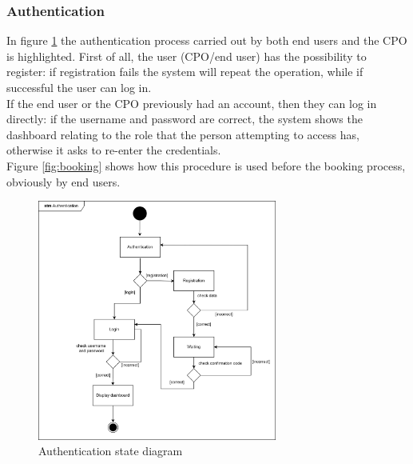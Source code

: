 \subsubsection{Authentication}
In figure \ref{fig:authentication} the authentication process carried out by both end users and the CPO is highlighted. First of all, the user (CPO/end user) has the possibility to register: if registration fails the system will repeat the operation, while if successful the user can log in. \\
If the end user or the CPO previously had an account, then they can log in directly: if the username and password are correct, the system shows the dashboard relating to the role that the person attempting to access has, otherwise it asks to re-enter the credentials.\\
Figure \ref{fig:booking} shows how this procedure is used before the booking process, obviously by end users.
\begin{figure}[H]
\begin{center}
\includegraphics[width=0.7\textwidth]{images/authentication.png}
\caption{Authentication state diagram}
\label{fig:authentication}
\end{center}
\end{figure}
